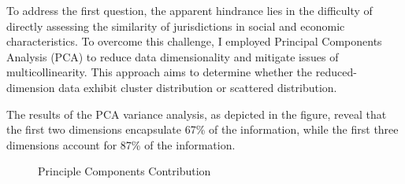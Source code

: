 \documentclass[man]{apa7}
\begin{document}
To address the first question, the apparent hindrance lies in the difficulty of directly assessing the similarity of jurisdictions in social and economic characteristics. To overcome this challenge, I employed Principal Components Analysis (PCA) to reduce data dimensionality and mitigate issues of multicollinearity. This approach aims to determine whether the reduced-dimension data exhibit cluster distribution or scattered distribution.

The results of the PCA variance analysis, as depicted in the figure, reveal that the first two dimensions encapsulate 67\% of the information, while the first three dimensions account for 87\% of the information.
\begin{figure}[H]
  \centering  %
  \caption[Principle Components Contribution]{Principle Components Contribution}    %
  \label{principlecomponentcontribution}    %
\end{figure}
\end{document}
